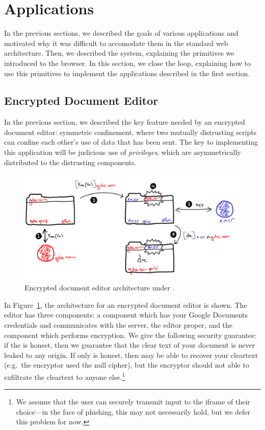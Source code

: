 \section{Applications}
\label{sec:apps}

In the previous sections, we described the goals of various applications
and motivated why it was difficult to accomodate them in the standard
web architecture.  Then, we described the \sys{} system, explaining the
primitives we introduced to the browser.  In this section, we close the
loop, explaining how to use this primitives to implement the
applications described in the first section.

\subsection{Encrypted Document Editor}

In the previous section, we described the key feature needed by an
encrypted document editor: symmetric confinement, where two mutually
distrusting scripts can confine each other's use of data that has been
sent.  The key to implementing this application will be judicious use of
\emph{privileges}, which are asymmetrically distributed to the
distrusting components.

\begin{figure}
\centerline{\includegraphics[width=\columnwidth]{editor2-byhand}}
\caption{\label{fig:editor} Encrypted document editor architecture
under \sys{}.}
\end{figure}

In Figure~\ref{fig:editor}, the architecture for an encrypted document
editor is shown.  The editor has three components: a component which has
your Google Documents credentials and communicates with the server, the
editor proper, and the component which performs encryption.  We give the
following security guarantee: if the  is honest, then we
guarantee that the clear text of your document is never leaked to any
origin.  If only  is honest, then  may
be able to recover your cleartext (e.g.\ the encryptor used the null
cipher), but the encryptor should not able to exfiltrate the cleartext
to anyone else.\footnote{We assume that the user can securely transmit
input to the iframe of their choice---in the face of phishing, this may
not necessarily hold, but we defer this problem for now.}

